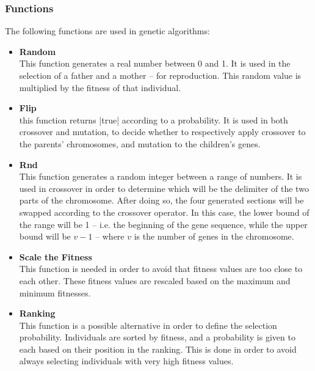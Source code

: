 \documentclass{article}
\begin{document}
\subsubsection{Functions}
The following functions are used in genetic algorithms:

\begin{itemize}
	\item \textbf{Random}
	\vspace{.2cm} \\
	This function generates a real number between 0 and 1. It is used in the selection of a father and a mother -- for reproduction. This random value is multiplied by the fitness of that individual.
	
	\item \textbf{Flip}
	\vspace{.2cm} \\
	this function returns \cverb|true| according to a probability. It is used in both crossover and mutation, to decide whether to respectively apply crossover to the parents' chromosomes, and mutation to the children's genes.
	
	\item \textbf{Rnd}
	\vspace{.2cm} \\
	This function generates a random integer between a range of numbers. It is used in crossover in order to determine which will be the delimiter of the two parts of the chromosome. After doing so, the four generated sections will be swapped according to the crossover operator. In this case, the lower bound of the range will be 1 -- i.e. the beginning of the gene sequence, while the upper bound will be $v - 1$ -- where $v$ is the number of genes in the chromosome.
	
	\item \textbf{Scale the Fitness}
	\vspace{.2cm} \\
	This function is needed in order to avoid that fitness values are too close to each other. These fitness values are rescaled based on the maximum and minimum fitnesses.
	
	\item \textbf{Ranking}
	\vspace{.2cm} \\
	This function is a possible alternative in order to define the selection probability. Individuals are sorted by fitness, and a probability is given to each based on their position in the ranking. This is done in order to avoid always selecting individuals with very high fitness values.
\end{itemize}
\end{document}
